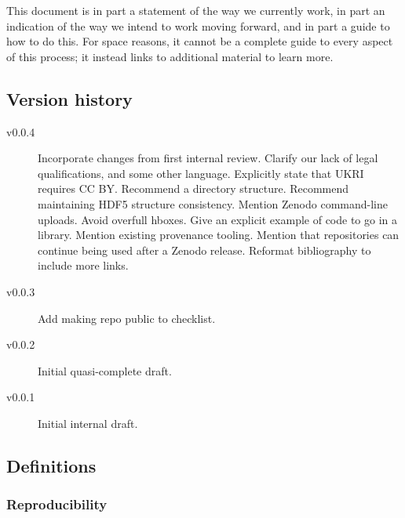 \documentclass{article}
\begin{document}
This document is in part a statement of the way we currently work,
in part an indication of the way we intend to work moving forward,
and in part a guide to how to do this.
For space reasons,
it cannot be a complete guide to every aspect of this process;
it instead links to additional material to learn more.

\tableofcontents

\subsection{Version history}

\begin{description}
  \item[v0.0.4]
        Incorporate changes from first internal review.
        Clarify our lack of legal qualifications,
        and some other language.
        Explicitly state that UKRI requires CC BY\@.
        Recommend a directory structure.
        Recommend maintaining HDF5 structure consistency.
        Mention Zenodo command-line uploads.
        Avoid overfull hboxes.
        Give an explicit example of code to go in a library.
        Mention existing provenance tooling.
        Mention that repositories can continue being used after a Zenodo release.
        Reformat bibliography to include more links.
  \item[v0.0.3]
        Add making repo public to checklist.
  \item[v0.0.2]
        Initial quasi-complete draft.
  \item[v0.0.1]
        Initial internal draft.
\end{description}

\subsection{Definitions}

\subsubsection{Reproducibility}\label{sec:reproducibility}
\end{document}
